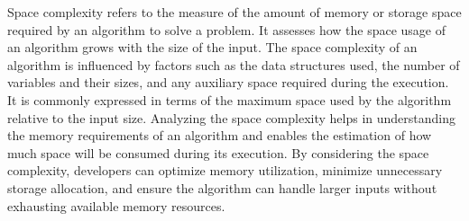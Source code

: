 Space complexity refers to the measure of the amount of memory or storage space required by an algorithm to solve a problem. It assesses how the space usage of an algorithm grows with the size of the input. The space complexity of an algorithm is influenced by factors such as the data structures used, the number of variables and their sizes, and any auxiliary space required during the execution. It is commonly expressed in terms 
of the maximum space used by the algorithm relative to the input size. Analyzing the space complexity helps in understanding the memory requirements of an algorithm and enables the estimation of how much space will be consumed during its execution. By considering the space complexity, developers can optimize memory utilization, minimize unnecessary storage allocation, and ensure the algorithm can handle larger inputs without 
exhausting available memory resources. \\

